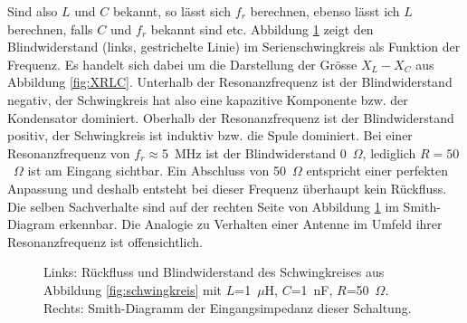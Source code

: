 \documentclass[twoside,a4paper,11pt,halfparskip,DIV=11,notitlepage]{scrartcl}
\newcommand{\uline}[1]{%
    \tikz[baseline=(todotted.base)]{
        \node[inner sep=1pt,outer sep=0pt] (todotted) {#1};
        \draw[color=HB9UFblue,thick] (todotted.south west) -- (todotted.south east);
    }%
}%
\newcommand{\udash}[1]{%
    \tikz[baseline=(todotted.base)]{
        \node[inner sep=1pt,outer sep=0pt] (todotted) {#1};
        \draw[dashed,color=HB9UFred,thick] (todotted.south west) -- (todotted.south east);
    }%
}%
\begin{document}
Sind also $L$ und $C$ bekannt, so lässt sich $f_r$ berechnen, ebenso lässt ich
$L$ berechnen, falls $C$ und $f_r$ bekannt sind etc. Abbildung \ref{fig:resonanzplot}
zeigt den Blindwiderstand (links, gestrichelte Linie) im Serienschwingkreis als Funktion der Frequenz. Es
handelt sich dabei um die Darstellung der Grösse $X_L-X_C$ aus Abbildung \ref{fig:XRLC}.
Unterhalb der Resonanzfrequenz ist der Blindwiderstand negativ, der
Schwingkreis hat also eine kapazitive Komponente bzw. der Kondensator
dominiert. Oberhalb der Resonanzfrequenz ist der Blindwiderstand positiv, der
Schwingkreis ist induktiv bzw. die Spule dominiert. Bei einer Resonanzfrequenz
von $f_r\approx$5~MHz ist der Blindwiderstand 0~$\Omega$, lediglich $R=50$~$\Omega$
ist am Eingang sichtbar. Ein Abschluss von 50~$\Omega$ entspricht einer perfekten
Anpassung und deshalb entsteht bei dieser Frequenz überhaupt kein Rückfluss.
Die selben Sachverhalte sind auf der rechten Seite von Abbildung
\ref{fig:resonanzplot} im Smith-Diagram erkennbar. Die Analogie zu Verhalten
einer Antenne im Umfeld ihrer Resonanzfrequenz ist offensichtlich.
\begin{figure}
\begin{center}
\hfill
{}\end{center}
\caption{Links: Rückfluss und Blindwiderstand des Schwingkreises aus Abbildung \ref{fig:schwingkreis} mit 
$L$=1~$\mu$H, $C$=1~nF, $R$=50~$\Omega$. Rechts: Smith-Diagramm der Eingangsimpedanz dieser Schaltung.}
\label{fig:resonanzplot}
\end{figure}
\end{document}
